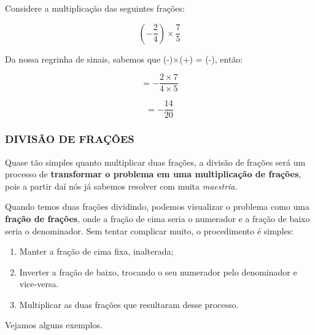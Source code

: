 \begin{exemplo}
    Considere a multiplicação das seguintes frações:

    \begin{equation}
        \left(-\frac{2}{4}\right)\times\frac{7}{5}
    \end{equation}

    Da nossa regrinha de sinais, sabemos que (-)\(\times\)(+) = (-), então:

    \begin{equation}
        =-\frac{2\times7}{4\times5}
    \end{equation}

    \begin{equation}
        =-\frac{14}{20}
    \end{equation}
\end{exemplo}


\subsubsection{DIVISÃO DE FRAÇÕES}
Quase tão simples quanto multiplicar duas frações, a divisão de frações será um processo de \textbf{transformar o problema em uma multiplicação de frações}, pois a partir daí nós já sabemos resolver com muita \textit{maestria}.

Quando temos duas frações dividindo, podemos visualizar o problema como uma \textbf{fração de frações}, onde a fração de cima seria o numerador e a fração de baixo seria o denominador. Sem tentar complicar muito, o procedimento é simples:

\begin{tcolorbox}[title = Procedimento para Divisão de Frações]

    \begin{enumerate}
        \item Manter a fração de cima fixa, inalterada;
        \item Inverter a fração de baixo, trocando o seu numerador pelo denominador e vice-versa.
        \item Multiplicar as duas frações que resultaram desse processo.
    \end{enumerate}
\end{tcolorbox}

Vejamos alguns exemplos.

